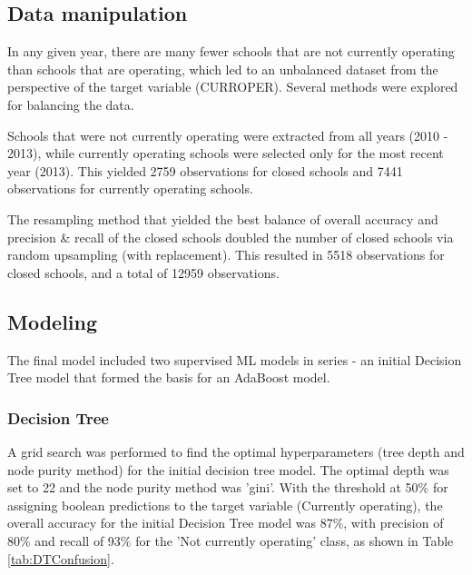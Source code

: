 \documentclass[11pt, letterpaper]{article}
\begin{document}
\subsection{Data manipulation}
In any given year, there are many fewer schools that are not currently operating than schools that are operating, which led to an unbalanced dataset from the perspective of the target variable (CURROPER). Several methods were explored for balancing the data.

Schools that were not currently operating were extracted from all years (2010 - 2013), while currently operating schools were selected only for the most recent year (2013). This yielded 2759 observations for closed schools and 7441 observations for currently operating schools.

The resampling method that yielded the best balance of overall accuracy and precision \& recall of the closed schools doubled the number of closed schools via random upsampling (with replacement). This resulted in 5518 observations for closed schools, and a total of 12959 observations.

\subsection{Modeling}
The final model included two supervised ML models in series - an initial Decision Tree model that formed the basis for an AdaBoost model. 

 \subsubsection{Decision Tree}
A grid search was performed to find the optimal hyperparameters (tree depth and node purity method) for the initial decision tree model. The optimal depth was set to 22 and the node purity method was 'gini'. With the  threshold at 50\% for assigning boolean predictions to the target variable (Currently operating), the overall accuracy for the initial Decision Tree model was 87\%, with precision of 80\% and recall of 93\% for the 'Not currently operating' class, as shown in Table \ref{tab:DTConfusion}.
   
\end{document}
